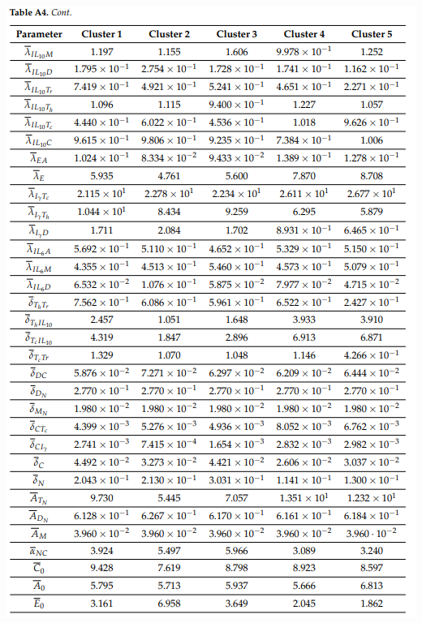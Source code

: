 \documentclass{article}
\begin{document}
\includegraphics[scale=.75]{a42.PNG}
\printbibliography
\end{document}
